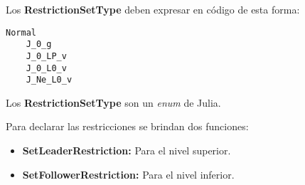 Los \textbf{RestrictionSetType} deben expresar en código de esta forma:
\begin{lstlisting}[caption={Definir el conjunto de índice activo}]
    Normal 
    J_0_g 
    J_0_LP_v
    J_0_L0_v
    J_Ne_L0_v
\end{lstlisting}

Los \textbf{RestrictionSetType} son un \textit{enum} de Julia.


Para declarar las restricciones se brindan dos funciones:
\begin{itemize}
    \item \textbf{SetLeaderRestriction:} Para el nivel superior.
    \item \textbf{SetFollowerRestriction:} Para el nivel inferior.
\end{itemize}
